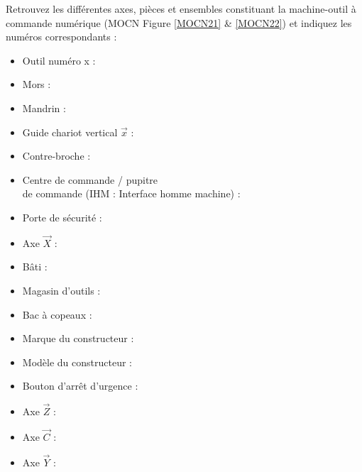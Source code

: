 \documentclass[12pt]{article}
\newcounter{exo}
\newenvironment{exo}{\stepcounter{exo}\vspace{0.5cm}{\bfseries Question \theexo\ :}}{\par\vspace{0.5cm}}
\begin{document}
\begin{exo}\label{exo1} Retrouvez les différentes axes, pièces et ensembles constituant la machine-outil à commande numérique (MOCN Figure \ref{MOCN21} \& \ref{MOCN22}) et indiquez les numéros correspondants :\\ \end{exo}
\begin{minipage}{.55\linewidth}
\begin{itemize}
    \item Outil numéro x :
    \item Mors :
    \item Mandrin :
    \item Guide chariot vertical $\overrightarrow{x}$ :
    \item Contre-broche :
    \item Centre de commande / pupitre\\ de commande (IHM : Interface homme machine) :
    \item Porte de sécurité :
    \item Axe $\overrightarrow{X}$ :
    \item Bâti :
\end{itemize}


\end{minipage}
\begin{minipage}{.44\linewidth}
\begin{itemize}
    \item Magasin d’outils :
    \item Bac à copeaux :
    \item Marque du constructeur :
    \item Modèle du constructeur :
    \item Bouton d'arrêt d’urgence :
    \item Axe $\overrightarrow{Z}$ :
    \item Axe $\overrightarrow{C}$ :
    \item Axe $\overrightarrow{Y}$ :
\end{itemize}
\end{minipage}
\end{document}
